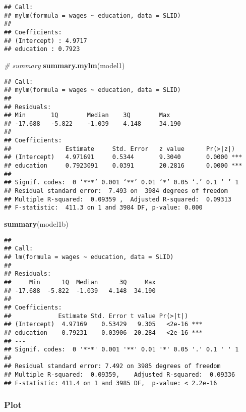 \documentclass[
]{article}
\newenvironment{Shaded}{\begin{snugshade}}{\end{snugshade}}
\newcommand{\CommentTok}[1]{\textcolor[rgb]{0.56,0.35,0.01}{\textit{#1}}}
\newcommand{\FunctionTok}[1]{\textcolor[rgb]{0.13,0.29,0.53}{\textbf{#1}}}
\newcommand{\NormalTok}[1]{#1}
\begin{document}
\begin{verbatim}
## Call:
## mylm(formula = wages ~ education, data = SLID)
## 
## Coefficients:
## (Intercept) : 4.9717 
## education : 0.7923
\end{verbatim}

\begin{Shaded}
\begin{Highlighting}[]
\CommentTok{\# summary }
\FunctionTok{summary.mylm}\NormalTok{(model1)}
\end{Highlighting}
\end{Shaded}

\begin{verbatim}
## Call:
## mylm(formula = wages ~ education, data = SLID)
## 
## Residuals:
## Min       1Q        Median    3Q        Max       
## -17.688   -5.822    -1.039    4.148     34.190    
## 
## Coefficients:
##               Estimate     Std. Error   z value      Pr(>|z|)     
## (Intercept)   4.971691     0.5344       9.3040       0.0000 ***   
## education     0.7923091    0.0391       20.2816      0.0000 ***   
## 
## Signif. codes:  0 ‘***’ 0.001 ‘**’ 0.01 ‘*’ 0.05 ‘.’ 0.1 ‘ ’ 1
## Residual standard error:  7.493 on  3984 degrees of freedom 
## Multiple R-squared:  0.09359 ,  Adjusted R-squared:  0.09313 
## F-statistic:  411.3 on 1 and 3984 DF, p-value: 0.000
\end{verbatim}

\begin{Shaded}
\begin{Highlighting}[]
\FunctionTok{summary}\NormalTok{(model1b)}
\end{Highlighting}
\end{Shaded}

\begin{verbatim}
## 
## Call:
## lm(formula = wages ~ education, data = SLID)
## 
## Residuals:
##     Min      1Q  Median      3Q     Max 
## -17.688  -5.822  -1.039   4.148  34.190 
## 
## Coefficients:
##             Estimate Std. Error t value Pr(>|t|)    
## (Intercept)  4.97169    0.53429   9.305   <2e-16 ***
## education    0.79231    0.03906  20.284   <2e-16 ***
## ---
## Signif. codes:  0 '***' 0.001 '**' 0.01 '*' 0.05 '.' 0.1 ' ' 1
## 
## Residual standard error: 7.492 on 3985 degrees of freedom
## Multiple R-squared:  0.09359,    Adjusted R-squared:  0.09336 
## F-statistic: 411.4 on 1 and 3985 DF,  p-value: < 2.2e-16
\end{verbatim}

\hypertarget{plot}{%
\subsubsection{Plot}\label{plot}}
\end{document}
